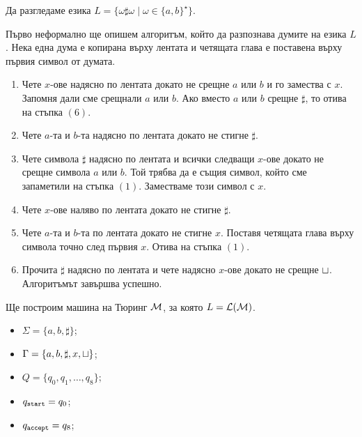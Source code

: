 \begin{example}
  Да разгледаме езика $L = \{\omega \sharp \omega \mid \omega\in\{a,b\}^\star\}$.
  
  Първо неформално ще опишем алгоритъм, който да разпознава думите на езика $L$.
  Нека една дума е копирана върху лентата и четящата глава е поставена върху първия символ от думата.
  \begin{enumerate}[(1)]
  \item
    Чете $x$-ове надясно по лентата докато не срещне $a$ или $b$ и го замества с $x$.
    Запомня дали сме срещнали $a$ или $b$.
    Ако вместо $a$ или $b$ срещне $\sharp$, то отива на стъпка $(6)$.
  \item
    Чете $a$-та и $b$-та надясно по лентата докато не стигне $\sharp$. 
  \item
    Чете символа $\sharp$ надясно по лентата и всички следващи $x$-ове докато не срещне символа $a$ или $b$.
    Той трябва да е същия символ, който сме запаметили на стъпка $(1)$.
    Заместваме този символ с $x$.
  \item
    Чете $x$-ове наляво по лентата докато не стигне $\sharp$.
  \item
    Чете $a$-та и $b$-та по лентата докато не стигне $x$.
    Поставя четящата глава върху символа точно след първия $x$.
    Отива на стъпка $(1)$.
  \item
    Прочита $\sharp$ надясно по лентата и чете надясно $x$-ове докато не срещне $\sqcup$.
    Алгоритъмът завършва успешно.
  \end{enumerate}

  Ще построим машина на Тюринг $\mathcal{M}$, за която $L = \mathcal{L}(\mathcal{M})$.
  \begin{itemize}
  \item 
    $\Sigma = \{a,b,\sharp\}$;
  \item
    $\Gamma = \{a,b,\sharp,x,\sqcup\}$;
  \item
    $Q = \{q_0,q_1,\dots,q_8\}$;
  \item
    $q_{\texttt{start}} = q_0$;
  \item
    $q_{\texttt{accept}} = q_8$;
  \end{itemize}

  \begin{framed}
  \begin{figure}[H]
    \begin{center}
\end{center}
\end{figure}
\end{framed}
\end{example}
